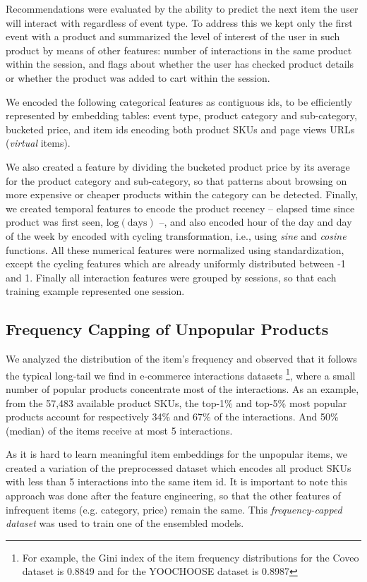 \documentclass[sigconf,screen]{acmart}
\begin{document}
Recommendations were evaluated by the ability to predict the next item the user will interact with regardless of event type. To address this we kept only the first event with a product and summarized the level of interest of the user in such product by means of other features: number of interactions in the same product within the session, and flags about whether the user has checked product details or whether the product was added to cart within the session.

We encoded the following categorical features as contiguous ids, to be efficiently represented by embedding tables: event type, product category and sub-category, bucketed price, and item ids encoding both product SKUs and page views URLs (\emph{virtual} items). 

We also created a feature by dividing the bucketed product price by its average for the product category and sub-category, so that patterns about browsing on more expensive or cheaper products within the category can be detected. Finally, we created temporal features to encode the product recency -- elapsed time since product was first seen, $ \text{log}(\text{days}) $ --, and also encoded hour of the day and day of the week by encoded with cycling transformation, i.e., using \emph{sine} and \emph{cosine} functions. All these numerical features were normalized using standardization, except the cycling features which are already uniformly distributed between -1 and 1. Finally all interaction features were grouped by sessions, so that each training example represented one session.


\subsection{Frequency Capping of Unpopular Products}
\label{sec:freq_cap}
We analyzed the distribution of the item's frequency and observed that it follows the typical long-tail we find in e-commerce interactions datasets \footnote{For example, the Gini index of the item frequency distributions for the Coveo dataset is 0.8849 and for the YOOCHOOSE dataset\cite{ben2015recsys} is 0.8987}, where a small number of popular products concentrate most of the interactions. As an example, from the 57,483 available product SKUs, the top-1\% and top-5\% most popular products account for respectively 34\% and 67\% of the interactions. And 50\% (median) of the items receive at most 5 interactions. 

As it is hard to learn meaningful item embeddings for the unpopular items, we created a variation of the preprocessed dataset which encodes all product SKUs with less than 5 interactions into the same item id. It is important to note this approach was done after the feature engineering, so that the other features of infrequent items (e.g. category, price) remain the same. This \emph{frequency-capped dataset} was used to train one of the ensembled models.
\end{document}
